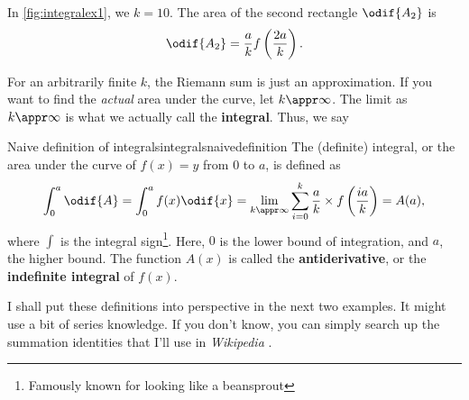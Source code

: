 In \cref{fig:integralex1}, we  $k = 10$. The area of the second rectangle $\odif{A_2}$ is
\begin{equation*}
	\odif{A_2} = \frac{a}{k}f\left(\frac{2a}{k}\right).
\end{equation*}

For an arbitrarily finite $k$, the Riemann sum is just an approximation. If you want to find the \textit{actual} area under the curve, let $k \appr \infty$. The limit as $k \appr \infty$ is what we actually call the \textbf{integral}. Thus, we say
\begin{df}{Naive definition of integrals}{integralsnaivedefinition}
	The (definite) integral, or the area under the curve of $f(x) = y$ from $0$ to $a$, is defined as
	\begin{equation}
		\int_{0}^{a}\odif{A} = \int_{0}^{a}f(x)\odif{x} = \lim_{k \appr \infty}\sum_{i = 0}^{k}\frac{a}{k} \times f\left(\frac{ia}{k}\right) = A(a),
	\end{equation}
	where $\int$ is the integral sign\footnote{Famously known for looking like a beansprout}. Here, $0$ is the lower bound of integration, and $a$, the higher bound. The function $A(x)$ is called the \textbf{antiderivative}, or the \textbf{indefinite integral} of $f(x)$.
\end{df}

I shall put these definitions into perspective in the next two examples. It might use a bit of series knowledge. If you don't know, you can simply search up the summation identities that I'll use in \emph{Wikipedia} \cite{wikipedia-summation}.

